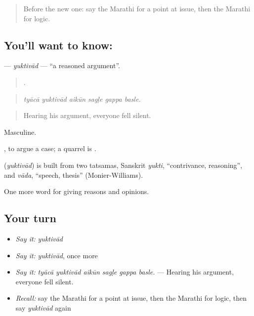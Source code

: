 \label{lesson:MR-C343-yuktivad}



\begin{quote}
Before the new one: say the Marathi for a point at issue, then the Marathi for logic.
\end{quote}

\subsection*{You'll want to know: }
\textbf{} — \emph{yuktivād} — \textquotedblleft{}a reasoned argument\textquotedblright{}.

\begin{quote}
     .
\end{quote}

\begin{quote}
\emph{tyācā yuktivād aikūn sagḷe gappa basle.}
\end{quote}

\begin{quote}
Hearing his argument, everyone fell silent.
\end{quote}

Masculine.

 , to argue a case; a quarrel is .

\begin{cousinweb}
\textbf{} (\emph{yuktivād}) is built from two tatsamas, Sanskrit \emph{yukti}, \textquotedblleft{}contrivance, reasoning\textquotedblright{}, and \emph{vāda}, \textquotedblleft{}speech, thesis\textquotedblright{} (Monier-Williams).
\end{cousinweb}

\begin{grammarlens}[title={What you've built}]
One more word for giving reasons and opinions.
\end{grammarlens}

\subsection*{Your turn}
\begin{itemize}
\raggedright
  \item \emph{Say it:} \emph{yuktivād}
  \item \emph{Say it:} \emph{yuktivād}, once more
  \item \emph{Say it:} \emph{tyācā yuktivād aikūn sagḷe gappa basle.} — Hearing his argument, everyone fell silent.
  \item \emph{Recall:} say the Marathi for a point at issue, then the Marathi for logic, then say \emph{yuktivād} again
\end{itemize}

